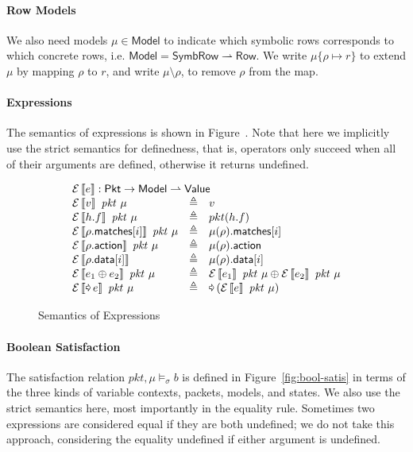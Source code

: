 \documentclass{article}
\newcommand{\pkt}{\mathit{pkt}}
\newcommand{\denote}[1]{\left\llbracket#1\right\rrbracket}
\newcommand{\edenote}[1]{\mathcal{E}\denote{#1}}
\newcommand{\binop}{\mathbin{\oplus}}
\newcommand{\unop}{\mathop{\text{\pointer}}}
\newcommand{\Value}{\mathsf{Value}}
\newcommand{\Pkt}{\mathsf{Pkt}}
\newcommand{\Model}{\mathsf{Model}}
\newcommand{\Row}{\mathsf{Row}}
\newcommand{\SymbRow}{\mathsf{SymbRow}}
\newcommand{\matches}{\mathsf{matches}}
\newcommand{\action}{\mathsf{action}}
\newcommand{\data}{\mathsf{data}}
\begin{document}
\paragraph{Row Models}
We also need models $\mu \in \Model$ to indicate which symbolic rows corresponds
to which concrete rows, i.e. $\Model = \SymbRow \rightharpoonup \Row$. We write
$\mu\{\rho \mapsto r\}$ to extend $\mu$ by mapping $\rho$ to $r$, and write $\mu
\setminus \rho$, to remove $\rho$ from the map.

\paragraph{Expressions}
The semantics of expressions is shown in Figure~\label{fig:sem-expr}. Note that
here we implicitly use the strict semantics for definedness, that is, operators
only succeed when all of their arguments are defined, otherwise it returns
undefined.

\begin{figure}[H]
  \[\begin{array}{l>{\triangleq}cl}
  \multicolumn{3}{l}{\edenote{e} : \Pkt \to \Model \rightharpoonup \Value }\\
    \edenote{v}~\pkt~\mu &&
    v \\
    \edenote{h.f}~\pkt~\mu &&
    pkt(h.f)\\
    \edenote{\rho.\matches[i]}~\pkt~\mu &&
    \mu(\rho).\matches[i] \\
    \edenote{\rho.\action}~\pkt~\mu &&
    \mu(\rho).\action \\
    \edenote{\rho.\data[i]} &&
    \mu(\rho).\data[i]\\
    \edenote{e_1 \binop e_2}~\pkt~\mu&&
    \edenote{e_1}~\pkt~\mu \binop
    \edenote{e_2}~\pkt~\mu \\
    \edenote{\unop e}~\pkt~\mu &&
    \unop \left(\edenote{e}~\pkt~\mu\right)
  \end{array}
  \]
  \caption{Semantics of Expressions}
  \label{fig:sem-expr}
\end{figure}

\paragraph{Boolean Satisfaction}
The satisfaction relation $\pkt,\mu \models_\sigma b$ is defined in
Figure~\ref{fig:bool-satis} in terms of the three kinds of variable contexts,
packets, models, and states. We also use the strict semantics here, most
importantly in the equality rule. Sometimes two expressions are considered equal
if they are both undefined; we do not take this approach, considering the
equality undefined if either argument is undefined.
\end{document}
